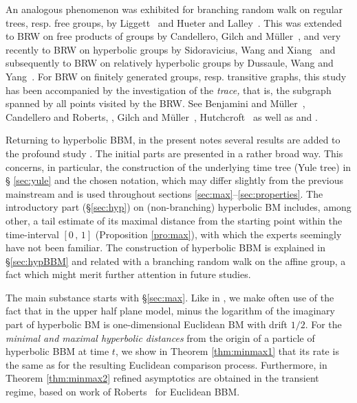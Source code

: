 \documentclass[12pt]{amsart}
\numberwithin{theorem}{section}
\theoremstyle{definition}
\begin{document}
An analogous phenomenon was exhibited for branching random walk on regular trees, resp. free groups,
by {\sc Liggett}~\cite{Li} and {\sc Hueter and Lalley}~\cite{HL}. This was extended to BRW on 
free products of groups by {\sc Candellero, Gilch and M\"uller}~\cite{CGM}, and very  recently  to 
BRW on hyperbolic groups by  {\sc Sidoravicius, Wang and Xiang}~\cite{SWX} and 
subsequently to BRW on relatively hyperbolic groups by {\sc Dussaule, Wang and Yang}~\cite{DWY}.
For BRW on finitely generated groups, resp. transitive graphs, this study has been accompanied by the 
investigation of the \emph{trace,} that is, the subgraph spanned by all points visited by the BRW.
See {\sc Benjamini and M\"uller}~\cite{BM}, {\sc Candellero and Roberts}, \cite{CR},
{\sc Gilch and M\"uller}~\cite{GiM}, {\sc Hutchcroft}~\cite{Hu} as well as \cite{SWX} and \cite{DWY}.


Returning to hyperbolic BBM, in the present notes several results are added to the 
profound study \cite{LS}.
The initial parts are presented in a rather broad way.
This concerns, in particular, the construction of the underlying time tree (Yule tree)  in \S 
\ref{sec:yule} and the chosen notation, which may differ slightly from the previous mainstream 
and is used
throughout sections \ref{sec:max}--\ref{sec:properties}. 
The introductory part (\S \ref{sec:hyp}) on (non-branching) hyperbolic BM includes, among other, 
a tail estimate of its maximal distance from the starting point within the time-interval 
$[0\,,\,1]$ (Proposition \ref{pro:max}), with which the experts seemingly have not been familiar. 
The construction of hyperbolic BBM is explained in 
\S \ref{sec:hypBBM} and related with a branching random walk on the affine group, a fact which might
merit further attention in future studies.

The main substance starts with \S \ref{sec:max}. Like in \cite{LS}, we make often use of the 
fact that in the upper half plane model, minus the logarithm of the imaginary part of hyperbolic BM
is one-dimensional Euclidean BM with drift $1/2$.
For the \emph{minimal and maximal hyperbolic distances} from the origin of a particle of hyperbolic 
BBM at time $t$, 
we show in Theorem \ref{thm:minmax1} that its rate is
the same as for the resulting Euclidean comparison process. 
Furthermore, in Theorem \ref{thm:minmax2} refined asymptotics are obtained 
in the transient regime, based on  
work of {\sc Roberts}~\cite{Ro} for Euclidean BBM.  
\end{document}
